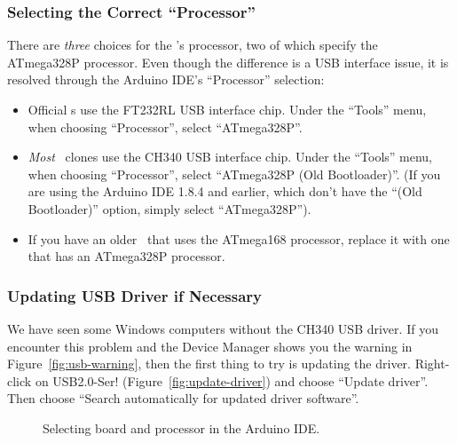 \subsubsection{Selecting the Correct ``Processor''}\label{subsubsec:processor-selection}

There are \textit{three} choices for the \developmentboard{}'s processor, two of which specify the ATmega328P processor.
Even though the difference is a USB interface issue, it is resolved through the Arduino IDE's ``Processor'' selection:

\begin{itemize}
    \item Official \developmentboard{}s use the FT232RL USB interface chip.
    Under the ``Tools'' menu, when choosing ``Processor'', select ``ATmega328P''.
    \item \textit{Most} \developmentboard\ clones use the CH340 USB interface chip.
    Under the ``Tools'' menu, when choosing ``Processor'', select ``ATmega328P (Old Bootloader)''.
    (If you are using the Arduino IDE 1.8.4 and earlier, which don't have the ``(Old Bootloader)'' option, simply select ``ATmega328P'').
    \item If you have an older \developmentboard\ that uses the ATmega168 processor, replace it with one that has an ATmega328P processor.
\end{itemize}

\subsubsection{Updating USB Driver if Necessary}

We have seen some Windows computers without the CH340 USB driver.
If you encounter this problem and the Device Manager shows you the warning in Figure~\ref{fig:usb-warning}, then the first thing to try is updating the driver.
Right-click on USB2.0-Ser! (Figure~\ref{fig:update-driver}) and choose ``Update driver''.
Then choose ``Search automatically for updated driver software''.

\begin{figure}
    \centering
    \hfil
    \caption{Selecting board and processor in the Arduino IDE.}
\end{figure}

